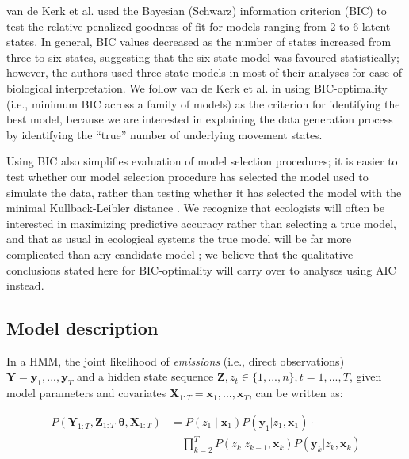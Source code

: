 \documentclass{bmcart}
\begin{document}
van de Kerk et al.\cite{kerk2015hidden} used the Bayesian (Schwarz) information criterion (BIC)
to test the relative penalized goodness of fit for
models ranging from 2 to 6 latent states.
In general, BIC values decreased as the number of states
increased from 
three to six states,
suggesting that the six-state model was
favoured statistically; however,
the authors used three-state models in most
of their analyses for ease of biological interpretation.
We follow van de Kerk et al.\cite{kerk2015hidden} in using BIC-optimality (i.e., minimum
BIC across a family of models) as the criterion for identifying
the best model, because we are interested in explaining the 
data generation process by identifying the ``true'' number 
of underlying movement states.  

Using BIC also simplifies 
evaluation of model selection procedures; 
it is easier to test whether our model selection
procedure has selected the model used to simulate the data,
rather than testing whether it has selected the model with
the minimal Kullback-Leibler distance
\cite{Richards2005}. We recognize that 
ecologists will often be interested in maximizing predictive
accuracy rather than selecting a true model, and that as
usual in ecological systems the true model will be far more
complicated than any candidate model \cite{BurnhamAnderson1998};
we believe that the qualitative conclusions stated here
for BIC-optimality will carry over to analyses using AIC instead.

\subsection*{Model description}

\newcommand{\obs}{\mathbf{y}}
\newcommand{\cov}{\mathbf{x}}
\newcommand{\state}{z}

In a HMM, the joint likelihood of \emph{emissions} (i.e., direct observations) $ \mathbf Y = \obs_{1},..., \obs_{T}$ 
and a hidden state sequence $\mathbf{Z}, \state_{t} \in \{1,...,n\}, t=1,...,T$, given model
parameters \boldmath{$\theta$} and covariates $\mathbf{X}_{1:T} =\cov_{1},..., \cov_{T}$, can be written as:

\begin{equation}
\begin{split}
P(\mathbf{Y}_{1:T},\mathbf{Z}_{1:T}|\boldsymbol \theta,\mathbf{X}_{1:T}) & =
P(\state_{1} \mid \cov_{1})P(\obs_{1} | \state_{1}, \cov_{1}) \cdot \\
&  \quad \prod\limits_{k=2}^{T}P(\state_{k} | \state_{k-1}, \cov_{k})P(\obs_{k} | \state_{k},\cov_{k})
\end{split}
\label{eq:HMMlik}
\end{equation}
\end{document}
